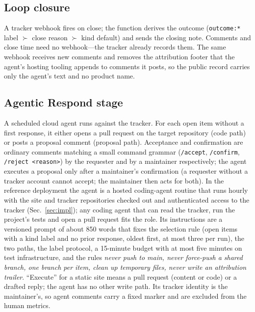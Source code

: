 \subsection{Loop closure}
A tracker webhook fires on close; the function derives the outcome (\texttt{outcome:*} label $\succ$ close reason $\succ$ kind default) and sends the closing note. Comments and close time need no webhook---the tracker already records them. The same webhook receives new comments and removes the attribution footer that the agent's hosting tooling appends to comments it posts, so the public record carries only the agent's text and no product name.

\subsection{Agentic Respond stage}
A scheduled cloud agent runs against the tracker. For each open item without a first response, it either opens a pull request on the target repository (code path) or posts a proposal comment (proposal path). Acceptance and confirmation are ordinary comments matching a small command grammar (\texttt{/accept}, \texttt{/confirm}, \texttt{/reject <reason>}) by the requester and by a maintainer respectively; the agent executes a proposal only after a maintainer's confirmation (a requester without a tracker account cannot accept; the maintainer then acts for both). In the reference deployment the agent is a hosted coding-agent routine that runs hourly with the site and tracker repositories checked out and authenticated access to the tracker (Sec.~\ref{sec:impl}); any coding agent that can read the tracker, run the project's tests and open a pull request fits the role. Its instructions are a versioned prompt of about 850 words that fixes the selection rule (open items with a kind label and no prior response, oldest first, at most three per run), the two paths, the label protocol, a 15-minute budget with at most five minutes on test infrastructure, and the rules \emph{never push to main, never force-push a shared branch, one branch per item, clean up temporary files, never write an attribution trailer}. ``Execute'' for a static site means a pull request (content or code) or a drafted reply; the agent has no other write path. Its tracker identity is the maintainer's, so agent comments carry a fixed marker and are excluded from the human metrics.
